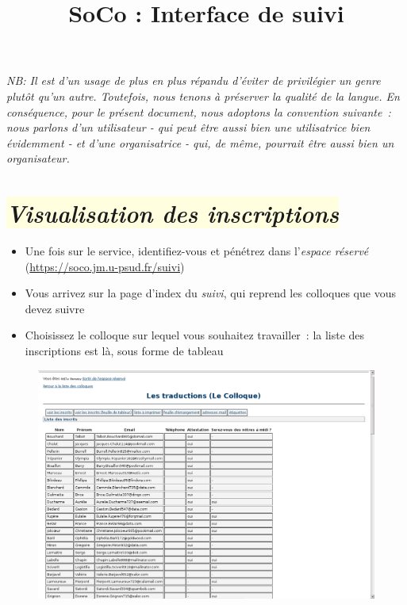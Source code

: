\documentclass[10pt,a4paper]{article}
\title{\bfseries{SoCo : Interface de suivi}}
\author{}
\date{}
\newcommand{\jaunepale}[1]{\colorbox{LightYellow}{#1}}
\begin{document}
\pagestyle{empty}


\maketitle



\small{\emph{NB: Il est d'un usage de plus en plus répandu d'éviter de privilégier un genre plutôt qu'un autre. Toutefois, nous tenons à préserver la qualité de la langue. En conséquence, pour le présent document, nous adoptons la convention suivante : nous parlons d'un utilisateur - qui peut être aussi bien une utilisatrice bien évidemment - et d'une organisatrice - qui, de même, pourrait être aussi bien un organisateur.}}

\normalsize

\section*{\jaunepale{\emph{Visualisation des inscriptions}}}

\begin{itemize}
  \item Une fois sur le service, identifiez-vous et pénétrez dans l'\emph{espace réservé} (\url{https://soco.jm.u-psud.fr/suivi})
  \item Vous arrivez sur la page d'index du \emph{suivi}, qui reprend les colloques que vous devez suivre
  \item Choisissez le colloque sur lequel vous souhaitez travailler : la liste des inscriptions est là, sous forme de tableau
\end{itemize}

\begin{figure}[h]
  \includegraphics[width=500px]{images/suivi-colloque-3}
 \end{figure}
\end{document}
